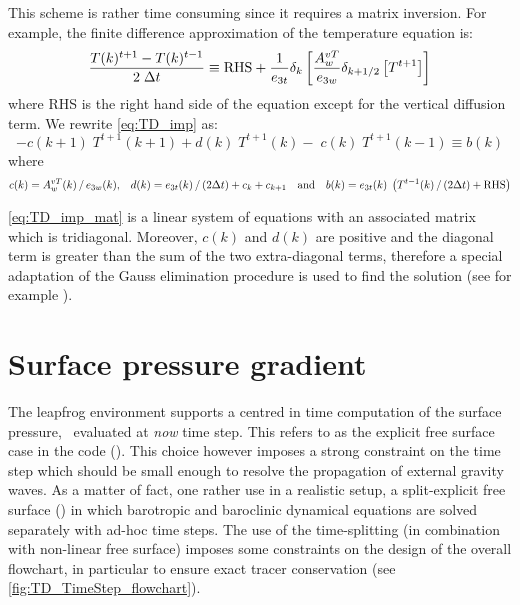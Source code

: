\documentclass[../main/NEMO_manual]{subfiles}
\begin{document}
This scheme is rather time consuming since it requires a matrix inversion.
For example, the finite difference approximation of the temperature equation is:
\[
  \frac{T(k)^{t + 1} - T(k)^{t - 1}}{2 \; \Delta t}
  \equiv
  \text{RHS} + \frac{1}{e_{3t}} \delta_k \left[ \frac{A_w^{vT}}{e_{3w} } \delta_{k + 1/2} \left[ T^{t + 1} \right] \right]
\]
where RHS is the right hand side of the equation except for the vertical diffusion term.
We rewrite \autoref{eq:TD_imp} as:
\begin{equation}
  \label{eq:TD_imp_mat}
  -c(k + 1) \; T^{t + 1}(k + 1) + d(k) \; T^{t + 1}(k) - \; c(k) \; T^{t + 1}(k - 1) \equiv b(k)
\end{equation}
where
\[
  c(k) = A_w^{vT} (k) \, / \, e_{3w} (k) \text{,} \quad
  d(k) = e_{3t}   (k)       \, / \, (2 \Delta t) + c_k + c_{k + 1} \quad \text{and} \quad
  b(k) = e_{3t}   (k) \; \left( T^{t - 1}(k) \, / \, (2 \Delta t) + \text{RHS} \right)
\]

\autoref{eq:TD_imp_mat} is a linear system of equations with
an associated matrix which is tridiagonal.
Moreover, $c(k)$ and $d(k)$ are positive and
the diagonal term is greater than the sum of the two extra-diagonal terms,
therefore a special adaptation of the Gauss elimination procedure is used to find the solution
(see for example \citet{richtmyer.morton_bk67}).

\section{Surface pressure gradient}
\label{sec:TD_spg_ts}

The leapfrog environment supports a centred in time computation of the surface pressure,
\ie\ evaluated at \textit{now} time step.
This refers to as the explicit free surface case in the code
().
This choice however imposes a strong constraint on the time step which
should be small enough to resolve the propagation of external gravity waves.
As a matter of fact, one rather use in a realistic setup,
a split-explicit free surface () in which
barotropic and baroclinic dynamical equations are solved separately with ad-hoc time steps.
The use of the time-splitting (in combination with non-linear free surface) imposes
some constraints on the design of the overall flowchart,
in particular to ensure exact tracer conservation (see \autoref{fig:TD_TimeStep_flowchart}).
\end{document}
